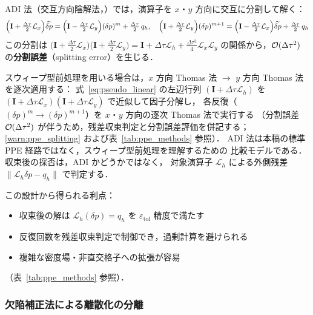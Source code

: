 ADI 法（交互方向陰解法，\cite{PeacemanRachford1955}）では，演算子を $x$・$y$ 方向に交互に分割して解く：
\begin{equation}
  \Bigl(\mathbf{I} + \tfrac{\Delta\tau}{2}\mathcal{L}_x\Bigr)\widetilde{\delta p}
  = \Bigl(\mathbf{I} - \tfrac{\Delta\tau}{2}\mathcal{L}_y\Bigr)(\delta p)^m + \tfrac{\Delta\tau}{2}\, q_h,
  \quad
  \Bigl(\mathbf{I} + \tfrac{\Delta\tau}{2}\mathcal{L}_y\Bigr)(\delta p)^{m+1}
  = \Bigl(\mathbf{I} - \tfrac{\Delta\tau}{2}\mathcal{L}_x\Bigr)\widetilde{\delta p} + \tfrac{\Delta\tau}{2}\, q_h
  \label{eq:ADI}
\end{equation}
この分割は
$
  \bigl(\mathbf{I}+\tfrac{\Delta\tau}{2}\mathcal{L}_x\bigr)
  \bigl(\mathbf{I}+\tfrac{\Delta\tau}{2}\mathcal{L}_y\bigr)
  = \mathbf{I} + \Delta\tau\mathcal{L}_h + \tfrac{\Delta\tau^2}{4}\mathcal{L}_x\mathcal{L}_y
$
の関係から，$\mathcal{O}(\Delta\tau^2)$ の\textbf{分割誤差}（splitting error）を生じる．

スウィープ型前処理を用いる場合は，$x$ 方向 Thomas 法 $\to$ $y$ 方向 Thomas 法を逐次適用する：
式~\eqref{eq:pseudo_linear} の左辺行列 $(\mathbf{I}+\Delta\tau\mathcal{L}_h)$ を
$(\mathbf{I}+\Delta\tau\mathcal{L}_x)(\mathbf{I}+\Delta\tau\mathcal{L}_y)$ で近似して因子分解し，
各反復（$(\delta p)^m \to (\delta p)^{m+1}$）を $x$・$y$ 方向の逐次 Thomas 法で実行する
（分割誤差 $\mathcal{O}(\Delta\tau^2)$ が伴うため，残差収束判定と分割誤差評価を併記する；
\ref{warn:ppe_splitting} および表~\ref{tab:ppe_methods} 参照）．
ADI 法は本稿の標準 PPE 経路ではなく，スウィープ型前処理を理解するための
比較モデルである．収束後の採否は，ADI かどうかではなく，
対象演算子 $\mathcal{L}_h$ による外側残差
$\|\mathcal{L}_h\delta p-q_h\|$ で判定する．

この設計から得られる利点：

\begin{itemize}
  \item 収束後の解は $\mathcal{L}_h(\delta p) = q_h$ を $\varepsilon_\text{tol}$ 精度で満たす
  \item 反復回数を残差収束判定で制御でき，過剰計算を避けられる
  \item 複雑な密度場・非直交格子への拡張が容易
\end{itemize}

（表~\ref{tab:ppe_methods} 参照）．

\subsubsection{欠陥補正法による離散化の分離}
\label{sec:defect_correction}

